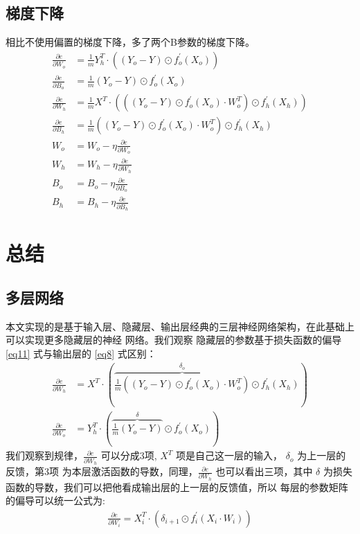 \documentclass[12pt, a4paper, oneside]{ctexart}
\begin{document}
\subsection{梯度下降}
相比不使用偏置的梯度下降，多了两个B参数的梯度下降。
\begin{align}    
    \frac{\partial e}{\partial W_o} &= \frac{1}{m}Y_h^T \cdot ((Y_o - Y) \odot f_o^{'}(X_o))    \nonumber \\
    \frac{\partial e}{\partial B_o} &= \frac{1}{m}(Y_o - Y) \odot f_o^{'}(X_o) \nonumber \\
    \frac{\partial e}{\partial W_h} &= \frac{1}{m}X^T \cdot (((Y_o - Y) \odot f_o^{'}(X_o) \cdot W_o^T) \odot f_h^{'}(X_h))  \nonumber \\
    \frac{\partial e}{\partial B_h} &= \frac{1}{m}((Y_o - Y) \odot f_o^{'}(X_o) \cdot W_o^T) \odot f_h^{'}(X_h) \nonumber \\
    W_o &= W_o - \eta\frac{\partial e}{\partial W_o} \nonumber \\
    W_h &= W_h - \eta\frac{\partial e}{\partial W_h} \nonumber \\
    B_o &= B_o - \eta\frac{\partial e}{\partial B_o} \nonumber \\
    B_h &= B_h - \eta\frac{\partial e}{\partial B_h} \nonumber 
\end{align}


\newpage
\section{总结}

\subsection{多层网络}
本文实现的是基于输入层、隐藏层、输出层经典的三层神经网络架构，在此基础上可以实现更多隐藏层的神经
网络。我们观察 隐藏层的参数基于损失函数的偏导 \eqref{eq11} 式与输出层的 \eqref{eq8} 式区别：
\begin{align}
    \frac{\partial e}{\partial W_h} &= X^T \cdot (\overbrace{\frac{1}{m}((Y_o - Y) \odot f_o^{'}(X_o) \cdot W_o^T)}^{\delta_o} \odot f_h^{'}(X_h)) \nonumber\\
    \frac{\partial e}{\partial W_o} &= Y_h^T \cdot (\overbrace{\frac{1}{m}(Y_o - Y)}^{\delta} \odot f_o^{'}(X_o)) \nonumber
\end{align}
我们观察到规律，$ \frac{\partial e}{\partial W_h}$ 可以分成3项, $X^T$ 项是自己这一层的输入，
$\delta_o$ 为上一层的反馈，第3项 为本层激活函数的导数，同理，$ \frac{\partial e}{\partial W_h}$ 
也可以看出三项，其中 $\delta$ 为损失函数的导数，我们可以把他看成输出层的上一层的反馈值，所以
每层的参数矩阵的偏导可以统一公式为:
\begin{align}
    \frac{\partial e}{\partial W_{i}} = X_i^T \cdot (\delta_{i+1} \odot f_i^{'}(X_i \cdot W_i))  \nonumber
\end{align}
\end{document}
